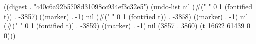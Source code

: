 
((digest . "c40c6a92b5308d31098cc934ef3c32e5") (undo-list nil (#("
" 0 1 (fontified t)) . -3857) ((marker) . -1) nil (#("
" 0 1 (fontified t)) . -3858) ((marker) . -1) nil (#("
" 0 1 (fontified t)) . -3859) ((marker) . -1) nil (3857 . 3860) (t 16622 61439 0 0)))
